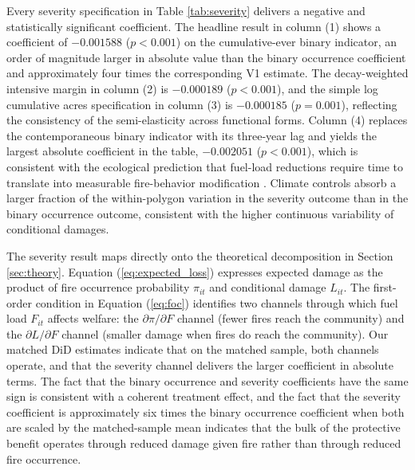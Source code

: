 \documentclass[12pt, letterpaper]{article}
\begin{document}
\begin{table}[H]
\begin{threeparttable}
\begin{tablenotes}
\end{tablenotes}
\end{threeparttable}
\end{table}

Every severity specification in Table \ref{tab:severity} delivers a negative and statistically significant coefficient. The headline result in column (1) shows a coefficient of $-0.001588$ ($p < 0.001$) on the cumulative-ever binary indicator, an order of magnitude larger in absolute value than the binary occurrence coefficient and approximately four times the corresponding V1 estimate. The decay-weighted intensive margin in column (2) is $-0.000189$ ($p < 0.001$), and the simple log cumulative acres specification in column (3) is $-0.000185$ ($p = 0.001$), reflecting the consistency of the semi-elasticity across functional forms. Column (4) replaces the contemporaneous binary indicator with its three-year lag and yields the largest absolute coefficient in the table, $-0.002051$ ($p < 0.001$), which is consistent with the ecological prediction that fuel-load reductions require time to translate into measurable fire-behavior modification \citep{stephens2012, agee2005}. Climate controls absorb a larger fraction of the within-polygon variation in the severity outcome than in the binary occurrence outcome, consistent with the higher continuous variability of conditional damages.

The severity result maps directly onto the theoretical decomposition in Section \ref{sec:theory}. Equation (\ref{eq:expected_loss}) expresses expected damage as the product of fire occurrence probability $\pi_{it}$ and conditional damage $L_{it}$. The first-order condition in Equation (\ref{eq:foc}) identifies two channels through which fuel load $F_{it}$ affects welfare: the $\partial \pi / \partial F$ channel (fewer fires reach the community) and the $\partial L / \partial F$ channel (smaller damage when fires do reach the community). Our matched DiD estimates indicate that on the matched sample, both channels operate, and that the severity channel delivers the larger coefficient in absolute terms. The fact that the binary occurrence and severity coefficients have the same sign is consistent with a coherent treatment effect, and the fact that the severity coefficient is approximately six times the binary occurrence coefficient when both are scaled by the matched-sample mean indicates that the bulk of the protective benefit operates through reduced damage given fire rather than through reduced fire occurrence.
\end{document}
